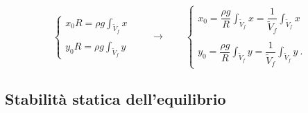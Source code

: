 \begin{equation}
\begin{cases}
   x_0 R = \rho g \displaystyle\int_{\tilde{V}_f} x \\ \\
   y_0 R = \rho g \displaystyle\int_{\tilde{V}_f} y 
\end{cases} \qquad \rightarrow \qquad
\begin{cases}
    x_0 = \dfrac{\rho g}{R}  \displaystyle\int_{\tilde{V}_f} x  
        = \dfrac{1}{\tilde{V}_f}  \displaystyle\int_{\tilde{V}_f} x 
    \\ \\
    y_0 = \dfrac{\rho g}{R}  \displaystyle\int_{\tilde{V}_f} y 
        = \dfrac{1}{\tilde{V}_f}  \displaystyle\int_{\tilde{V}_f} y \ .
\end{cases}
\end{equation}


\subsection{Stabilità statica dell'equilibrio}






